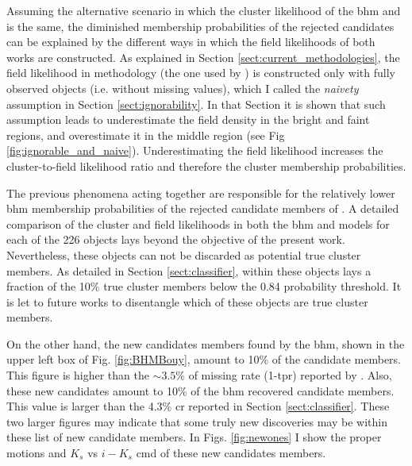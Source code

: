 Assuming the alternative scenario in which the cluster likelihood of the \gls{bhm} and \citet{Bouy2015} is the same, the diminished membership probabilities of the rejected candidates \citet{Bouy2015} can be explained by the different ways in which the field likelihoods of both works are constructed. As explained in Section \ref{sect:current_methodologies}, the field likelihood in \citet{Sarro2014} methodology (the one used by \citet{Bouy2015}) is constructed only with fully observed objects (i.e. without missing values), which I called the \emph{naivety} assumption in Section \ref{sect:ignorability}. In that Section it is shown that such assumption leads to underestimate the field density in the bright and faint regions, and overestimate it in the middle region (see Fig \ref{fig:ignorable_and_naive}). Underestimating the field likelihood increases the cluster-to-field likelihood ratio and therefore the cluster membership probabilities. 

The previous phenomena acting together are responsible for the relatively lower \gls{bhm} membership probabilities of the rejected candidate members of \citet{Bouy2015}. A detailed comparison of the cluster and field likelihoods in both the \gls{bhm} and \citet{Bouy2015} models for each of the 226 objects lays beyond the objective of the present work. Nevertheless, these objects can not be discarded as potential true cluster members. As detailed in Section \ref{sect:classifier}, within these objects lays a fraction of the 10\% true cluster members below the 0.84 probability threshold. It is let to future works to disentangle which of these objects are true cluster members. 

On the other hand, the new candidates members found by the \gls{bhm}, shown in the upper left box of Fig. \ref{fig:BHMBouy}, amount to 10\% of the \citet{Bouy2015} candidate members. This figure is higher than the $\sim 3.5\%$ of missing rate (1-\gls{tpr}) reported by \citet{Sarro2014}. Also, these new candidates amount to 10\% of the \gls{bhm} recovered candidate members. This value is larger than the 4.3\% \gls{cr} reported in Section \ref{sect:classifier}. These two larger figures may indicate that some truly new discoveries may be within these list of new candidate members. In Figs. \ref{fig:newones} I show the proper motions and $K_s$ vs $i-K_s$ \gls{cmd} of these new candidates members.


